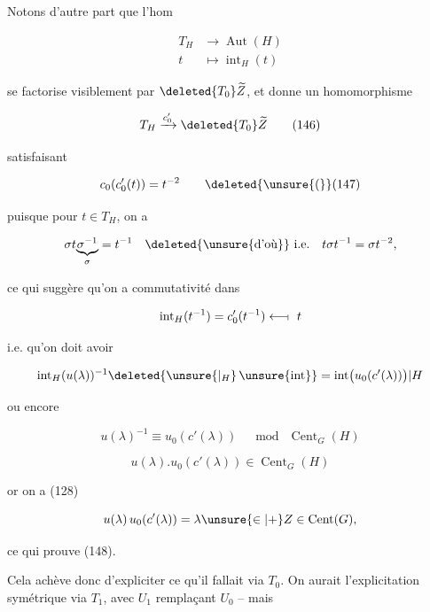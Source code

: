 Notons d'autre part que l'hom

\[
\begin{aligned}
T_H&\longrightarrow\operatorname{Aut}(H)\\
t&\longmapsto\operatorname{int}_H(t)
\end{aligned}
\]

se factorise visiblement par $\deleted{T_0}\widetilde Z$, et donne un homomorphisme

\[
T_H\xrightarrow{c'_0}\deleted{T_0}\widetilde Z\tag*{(146)}
\]

satisfaisant

\[
c_0(c'_0(t))=t^{-2}\tag*{\deleted{\unsure{(}}(147)}
\]

puisque pour $t\in T_H$, on a

\[
\sigma t\underset{\sigma}{\underbrace{\sigma^{-1}}}=t^{-1}\quad\deleted{\unsure{\text{d'où}}}\ \text{i.e.}\quad t\sigma t^{-1}=\sigma t^{-2},
\]

ce qui suggère qu'on a commutativité dans



\[
\operatorname{int}_H(t^{-1})=c'_0(t^{-1})\longleftarrow\joinrel\shortmid\ t
\]

i.e. qu'on doit avoir

\[
\operatorname{int}_H(u(\lambda))^{-1}\deleted{\unsure{\vert_H}\,\unsure{\operatorname{int}}}
=\operatorname{int}\bigl(u_0(c'(\lambda))\bigr)|H
\]

ou encore

\[
u(\lambda)^{-1}\equiv u_0(c'(\lambda))\quad\bmod\ \operatorname{Cent}_G(H)
\]


\[
u(\lambda).u_0(c'(\lambda))\in\operatorname{Cent}_G(H)
\]

or on a (128)

\[
u(\lambda)\,u_0(c'(\lambda))=\lambda\unsure{\in|+}Z\in\operatorname{Cent}(G),
\]

ce qui  prouve (148).

Cela achève donc d'expliciter ce qu'il fallait via $T_0$. On aurait l'explicitation symétrique via $T_1$, avec $U_1$ remplaçant $U_0$ -- mais  

